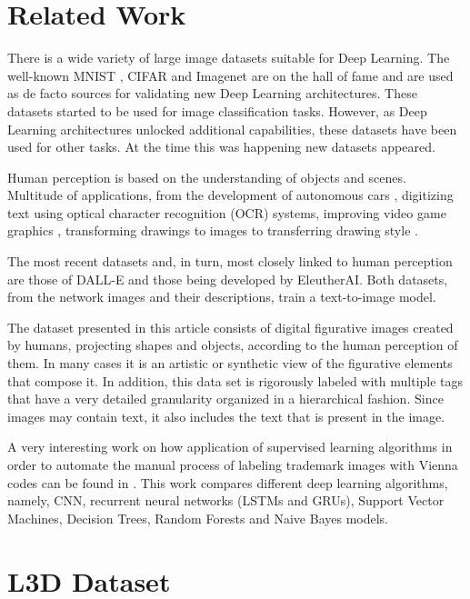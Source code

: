 \documentclass{article}
\begin{document}
\section{Related Work}
There is a wide variety of large image datasets suitable for Deep Learning. The well-known MNIST \citep{lecun-mnisthandwrittendigit-2010}, CIFAR \citep{Krizhevsky09learningmultiple} and Imagenet \citep{deng2009imagenet} are on the hall of fame and are used as de facto sources for validating new Deep Learning architectures. These datasets started to be used for image classification tasks. However, as Deep Learning architectures unlocked additional capabilities, these datasets have been used for other tasks. At the time this was happening new datasets appeared.

Human perception is based on the understanding of objects and scenes. Multitude of applications, from the development of autonomous cars \citep{Argoverse, yu2020bdd100k, Cordts2016Cityscapes, 1812.05752}, digitizing text using optical character recognition (OCR) systems, improving video game graphics \citep{Richter_2021}, transforming drawings to images \citep{park2019semantic} to transferring drawing style \citep{li2018learning}.

The most recent datasets and, in turn, most closely linked to human perception are those of DALL-E \citep{ramesh2021zeroshot} and those being developed by EleutherAI. Both datasets, from the network images and their descriptions, train a text-to-image model.

The dataset presented in this article consists of digital figurative images created by humans, projecting shapes and objects, according to the human perception of them. In many cases it is an artistic or synthetic view of the figurative elements that compose it. In addition, this data set is rigorously labeled with multiple tags that have a very detailed granularity organized in a hierarchical fashion. Since images may contain text, it also includes the text that is present in the image.

A very interesting work on how application of supervised learning algorithms in order to automate the manual process of labeling trademark images with Vienna codes can be found in \cite{Uzairi1606039}. This work compares different deep learning algorithms, namely, CNN, recurrent neural networks (LSTMs and GRUs), Support Vector Machines, Decision Trees, Random Forests and Naive Bayes models.


\section{L3D Dataset}
\end{document}
